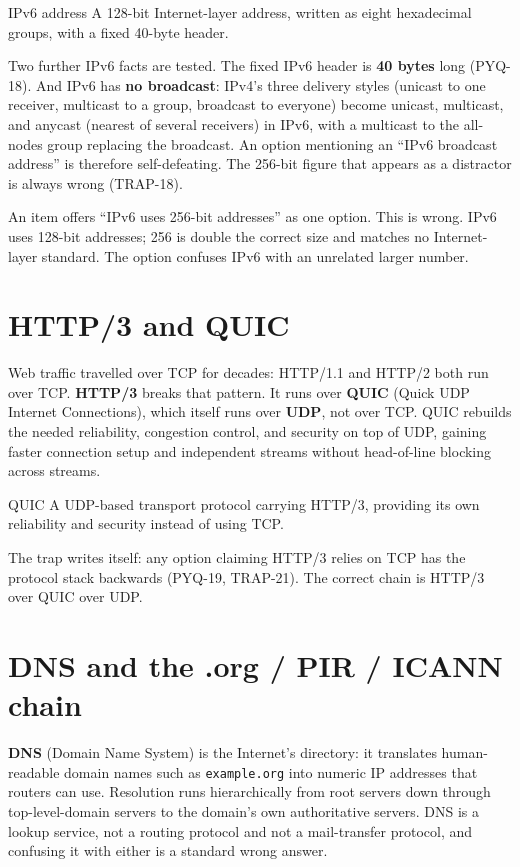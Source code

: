 \begin{definitionbox}{IPv6 address}
A 128-bit Internet-layer address, written as eight hexadecimal groups, with a
fixed 40-byte header.
\end{definitionbox}

Two further IPv6 facts are tested. The fixed IPv6 header is \textbf{40 bytes}
long (PYQ-18). And IPv6 has \textbf{no broadcast}: IPv4's three delivery
styles (unicast to one receiver, multicast to a group, broadcast to everyone)
become unicast, multicast, and anycast (nearest of several receivers) in
IPv6, with a multicast to the all-nodes group replacing the broadcast. An
option mentioning an ``IPv6 broadcast address'' is therefore self-defeating.
The 256-bit figure that appears as a distractor is always wrong (TRAP-18).

\begin{example}
An item offers ``IPv6 uses 256-bit addresses'' as one option. This is wrong.
IPv6 uses 128-bit addresses; 256 is double the correct size and matches no
Internet-layer standard. The option confuses IPv6 with an unrelated larger
number.
\end{example}

\section{HTTP/3 and QUIC}
Web traffic travelled over TCP for decades: HTTP/1.1 and HTTP/2 both run
over TCP. \textbf{HTTP/3} breaks that pattern. It runs over \textbf{QUIC}
(Quick UDP Internet Connections), which itself runs over \textbf{UDP}, not
over TCP. QUIC rebuilds the needed reliability, congestion control, and
security on top of UDP, gaining faster connection setup and independent
streams without head-of-line blocking across streams.

\begin{definitionbox}{QUIC}
A UDP-based transport protocol carrying HTTP/3, providing its own reliability
and security instead of using TCP.
\end{definitionbox}

The trap writes itself: any option claiming HTTP/3 relies on TCP has the
protocol stack backwards (PYQ-19, TRAP-21). The correct chain is HTTP/3 over
QUIC over UDP.

\section{DNS and the .org / PIR / ICANN chain}
\textbf{DNS} (Domain Name System) is the Internet's directory: it translates
human-readable domain names such as \texttt{example.org} into numeric IP
addresses that routers can use. Resolution runs hierarchically from root
servers down through top-level-domain servers to the domain's own
authoritative servers. DNS is a lookup service, not a routing protocol and
not a mail-transfer protocol, and confusing it with either is a standard
wrong answer.


